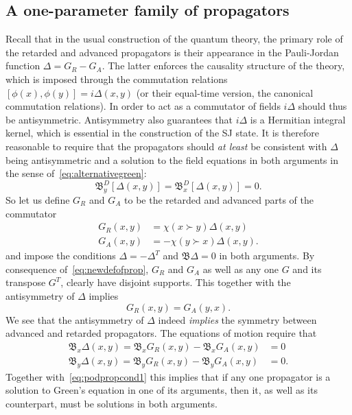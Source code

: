 \documentclass[12pt]{article}
\newcommand{\be}{\begin{equation}}
\newcommand{\ee}{\end{equation}}
\def\bea{\begin{equation}\begin{aligned}}
\def\eea{\end{aligned}\end{equation}}
\begin{document}
\subsection{A one-parameter family of propagators}
Recall that in the usual construction of the quantum theory, the primary role of the retarded and advanced propagators is their appearance in the Pauli-Jordan function $\Delta = G_R - G_A$. The latter enforces the causality structure of the theory, which is imposed through the commutation relations $[\phi(x),\phi(y)]=i\Delta(x,y)$ (or their equal-time version, the canonical commutation relations). In order to act as a commutator of fields $i\Delta$ should thus be antisymmetric. Antisymmetry also guarantees that $i\Delta$ is a Hermitian integral kernel, which is essential in the construction of the SJ state. It is therefore reasonable to require that the propagators should \emph{at least} be consistent with $\Delta$ being antisymmetric and a solution to the field equations in both arguments in the sense of~\eqref{eq:alternativegreen}:
\be
\mathfrak B ^D_y\left[\Delta(x,y)\right]=\mathfrak B ^D_x\left[\Delta(x,y)\right]=0.
\ee
So let us define $G_R$ and $G_A$ to be the retarded and advanced parts of the commutator
\bea
G_R(x,y)&=\chi(x\succ y)\Delta(x,y)\\
G_A(x,y)&=-\chi(y\succ x)\Delta(x,y).\label{eq:newdefofprop}
\eea
and impose the conditions $\Delta=-\Delta^T$ and $\mathfrak B\Delta=0$ in both arguments. By consequence of~\eqref{eq:newdefofprop}, $G_R$ and $G_A$ as well as any one $G$ and its transpose $G^T$, clearly have disjoint supports. This together with the antisymmetry of $\Delta$ implies
\be
G_R(x,y)=G_A(y,x).\label{eq:podpropcond1}
\ee
We see that the antisymmetry of $\Delta$ indeed \emph{implies} the symmetry between advanced and retarded propagators. The equations of motion require that
\bea
\mathfrak B_x\Delta(x,y)=\mathfrak B_x G_R(x,y) - \mathfrak B_x G_A(x,y) &=0\\
\mathfrak B_y\Delta(x,y)=\mathfrak B_y G_R(x,y) - \mathfrak B_y G_A(x,y) &=0.
\eea
Together with~\eqref{eq:podpropcond1} this implies that if any one propagator is a solution to Green's equation in one of its arguments, then it, as well as its counterpart, must be solutions in both arguments.
\end{document}
